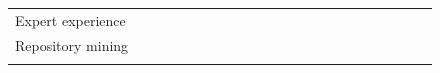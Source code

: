 \documentclass[english, 12pt, a4paper, sci, utf8, a-1b, online]{aaltothesis}
\begin{document}
{\begin{center}
\begin{longtable}{p{0.3\linewidth}p{0.6\linewidth}}
      Expert experience                            & \textcite{entering-an-ecosystem} \newline \textcite{myers2016improving} \newline \textcite{macvean2016api} \newline \textcite{karpanoja2016exploring} \newline \textcite{nazariodetecting}                                                                                                                                                                                                                                                                                                                                                                                                                                                                                                                                                                                                                                                                                                                                                         \\
      Repository mining                            & \textcite{fontao2017facing} \newline \textcite{de2017towards} \newline \textcite{claussen2019role}                                                                                                                                                                                                                                                                                                                                                                                                                                                                                                                                                                                                                                                                                                                                                                                                                                                 \\
                                                   &                                                                                                                                                                                                                                                                                                                                                                                                                                                                                                                                                                                                                                                                                                                                                                                                                                                                                                                                                    \\

\end{longtable}
\end{center}}
\end{document}
